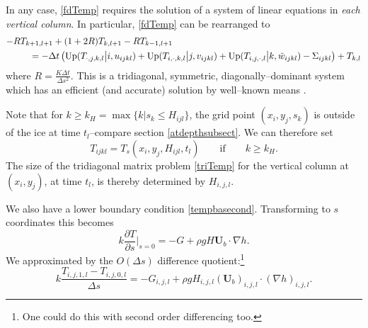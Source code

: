 \documentclass[12pt,final]{amsart}%
\theoremstyle{plain}
\theoremstyle{definition}
\theoremstyle{remark}
\newcommand{\dds}[1]{\ensuremath{\frac{\partial #1}{\partial s}}}
\newcommand{\grad}{\nabla}
\newcommand{\Up}{\ensuremath{\operatorname{Up}}}
\newcommand{\bU}{{\mathbf{U}}}
\begin{document}
In any case, \eqref{fdTemp} requires the solution of a system of linear equations in \emph{each vertical column}.  In particular, \eqref{fdTemp} can be rearranged to
\begin{align}\label{triTemp}
-R &T_{k+1,l+1} + (1+2R) T_{k,l+1} - R T_{k-1,l+1} \\
    &\quad = -\Delta t \left(\Up(T_{\cdot,j,k,l} \big|i,u_{ijkl}) + \Up(T_{i,\cdot,k,l} \big|j,v_{ijkl}) + \Up(T_{i,j,\cdot,l} \big|k,\tilde w_{ijkl}) - \Sigma_{ijkl}\right) + T_{k,l}\notag
\end{align}
where $R=\frac{K\Delta t}{\Delta s^2}$.  This is a tridiagonal, symmetric, diagonally--dominant system which has an efficient (and accurate) solution by well--known means \citep{Pressetal}.

Note that for $k \ge k_H = \max\{k\big|s_k\le H_{ijl}\}$, the grid point $(x_i,y_j,s_k)$ is outside of the ice at time $t_l$--compare section \ref{atdepthsubsect}.  We can therefore set
\begin{equation}\label{Taboveice}
T_{ijkl}=T_s(x_i,y_j,H_{ijl},t_l) \qquad \text{if} \qquad k\ge k_H.
\end{equation}
The size of the tridiagonal matrix problem \eqref{triTemp} for the vertical column at $(x_i,y_j)$, at time $t_l$, is thereby determined by $H_{i,j,l}$.

We also have a lower boundary condition \eqref{tempbasecond}.  Transforming to $s$ coordinates this becomes
\begin{equation}\label{stempbasecond}
k\dds{T}\Big|_{s=0} = -G + \rho g H \bU_b\cdot \grad h.
\end{equation}
We approximated by the $O(\Delta s)$ difference quotient:\footnote{One could do this with second order differencing too.}
\begin{equation}\label{stempbasefd}
k\frac{T_{i,j,1,l}-T_{i,j,0,l}}{\Delta s} = -G_{i,j,l} +\rho g H_{i,j,l} (\bU_b)_{i,j,l}\cdot(\grad h)_{i,j,l}.
\end{equation}
\end{document}
